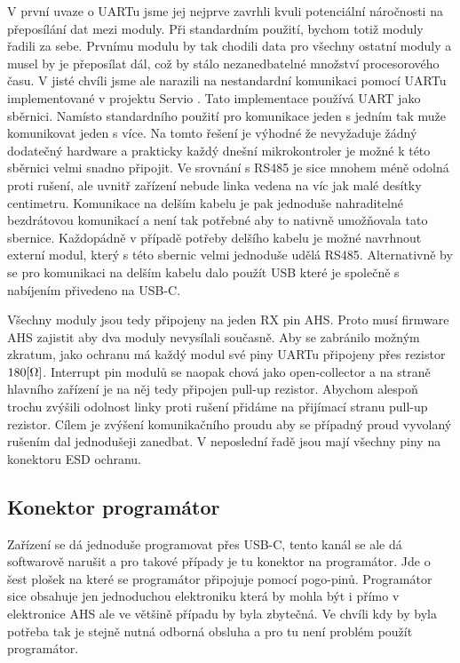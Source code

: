 V první uvaze o UARTu jsme jej nejprve zavrhli kvuli potenciální náročnosti na přeposílání dat mezi moduly.
Při standardním použití, bychom totiž moduly řadili za sebe.
Prvnímu modulu by tak chodili data pro všechny ostatní moduly a musel by je přeposílat dál, což by stálo nezanedbatelné množství procesorového času.
V jisté chvíli jsme ale narazili na nestandardní komunikaci pomocí UARTu implementované v projektu Servio \cite{Servio}.
Tato implementace používá UART jako sběrnici.
Namísto standardního použití pro komunikace jeden s jedním tak muže komunikovat jeden s více.
Na tomto řešení je výhodné že nevyžaduje žádný dodatečný hardware a prakticky každý dnešní mikrokontroler je možné k této sběrnici velmi snadno připojit.
Ve srovnání s RS485 je sice mnohem méně odolná proti rušení, ale uvnitř zařízení nebude linka vedena na víc jak malé desítky centimetru.
Komunikace na delším kabelu je pak jednoduše nahraditelné bezdrátovou komunikací a není tak potřebné aby to nativně umožňovala tato sbernice.
Každopádně v případě potřeby delšího kabelu je možné navrhnout externí modul, který s této sbernic velmi jednoduše udělá RS485.
Alternativně by se pro komunikaci na delším kabelu dalo použít USB které je společně s nabíjením přivedeno na USB-C.

Všechny moduly jsou tedy připojeny na jeden RX pin AHS.
Proto musí firmware AHS zajistit aby dva moduly nevysílali současně.
Aby se zabránilo možným zkratum, jako ochranu má každý modul své piny UARTu připojeny přes rezistor \(180\-[\Omega]\).
Interrupt pin modulů se naopak chová jako open-collector a na straně hlavního zařízení je na něj tedy připojen pull-up rezistor.
Abychom alespoň trochu zvýšili odolnost linky proti rušení přidáme na přijímací stranu pull-up rezistor.
Cílem je zvýšení komunikačního proudu aby se případný proud vyvolaný rušením dal jednodušeji zanedbat.
V neposlední řadě jsou mají všechny piny na konektoru ESD ochranu.

\subsection{Konektor programátor}
Zařízení se dá jednoduše programovat přes USB-C, tento kanál se ale dá softwarově narušit a pro takové případy je tu konektor na programátor.
Jde o šest plošek na které se programátor připojuje pomocí pogo-pinů.
Programátor sice obsahuje jen jednoduchou elektroniku která by mohla být i přímo v elektronice AHS ale ve většině případu by byla zbytečná.
Ve chvíli kdy by byla potřeba tak je stejně nutná odborná obsluha a pro tu není problém použít programátor.

